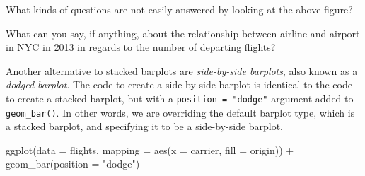 \documentclass[
  letterpaper,
  DIV=11,
  numbers=noendperiod]{scrreprt}
\newenvironment{Shaded}{\begin{snugshade}}{\end{snugshade}}
\newcommand{\AttributeTok}[1]{\textcolor[rgb]{0.40,0.45,0.13}{#1}}
\newcommand{\FunctionTok}[1]{\textcolor[rgb]{0.28,0.35,0.67}{#1}}
\newcommand{\NormalTok}[1]{\textcolor[rgb]{0.00,0.23,0.31}{#1}}
\newcommand{\SpecialCharTok}[1]{\textcolor[rgb]{0.37,0.37,0.37}{#1}}
\newcommand{\StringTok}[1]{\textcolor[rgb]{0.13,0.47,0.30}{#1}}
\theoremstyle{definition}
\theoremstyle{remark}
\begin{document}
\begin{tcolorbox}[enhanced jigsaw, colback=white, toprule=.15mm, bottomrule=.15mm, titlerule=0mm, title={{🎯} Learning Check 2.32}, leftrule=.75mm, arc=.35mm, left=2mm, colframe=quarto-callout-tip-color-frame, coltitle=black, opacitybacktitle=0.6, bottomtitle=1mm, colbacktitle=quarto-callout-tip-color!10!white, opacityback=0, toptitle=1mm, rightrule=.15mm, breakable]

What kinds of questions are not easily answered by looking at the above
figure?

\end{tcolorbox}

\begin{tcolorbox}[enhanced jigsaw, colback=white, toprule=.15mm, bottomrule=.15mm, titlerule=0mm, title={{🎯} Learning Check 2.33}, leftrule=.75mm, arc=.35mm, left=2mm, colframe=quarto-callout-tip-color-frame, coltitle=black, opacitybacktitle=0.6, bottomtitle=1mm, colbacktitle=quarto-callout-tip-color!10!white, opacityback=0, toptitle=1mm, rightrule=.15mm, breakable]

What can you say, if anything, about the relationship between airline
and airport in NYC in 2013 in regards to the number of departing
flights?

\end{tcolorbox}

Another alternative to stacked barplots are \emph{side-by-side
barplots}, also known as a \emph{dodged barplot}. The code to create a
side-by-side barplot is identical to the code to create a stacked
barplot, but with a \texttt{position\ =\ "dodge"} argument added to
\texttt{geom\_bar()}. In other words, we are overriding the default
barplot type, which is a stacked barplot, and specifying it to be a
side-by-side barplot.

\begin{Shaded}
\begin{Highlighting}[]
\FunctionTok{ggplot}\NormalTok{(}\AttributeTok{data =}\NormalTok{ flights, }\AttributeTok{mapping =} \FunctionTok{aes}\NormalTok{(}\AttributeTok{x =}\NormalTok{ carrier, }\AttributeTok{fill =}\NormalTok{ origin)) }\SpecialCharTok{+}
  \FunctionTok{geom\_bar}\NormalTok{(}\AttributeTok{position =} \StringTok{"dodge"}\NormalTok{)}
\end{Highlighting}
\end{Shaded}
\end{document}
